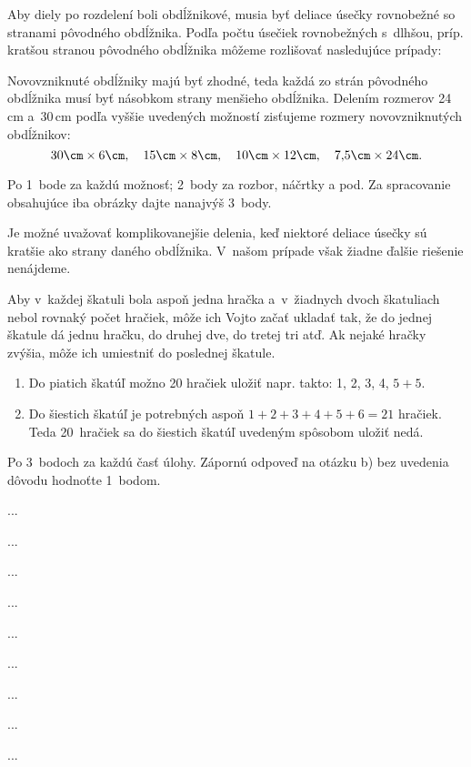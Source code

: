 {%
Aby diely po rozdelení boli obdĺžnikové, musia byť deliace úsečky rovnobežné so stranami pôvodného obdĺžnika.
Podľa počtu úsečiek rovnobežných s~dlhšou, príp. kratšou stranou pôvodného obdĺžnika môžeme rozlišovať nasledujúce prípady:
%

Novovzniknuté obdĺžniky majú byť zhodné, teda každá zo strán pôvodného obdĺžnika musí byť násobkom strany menšieho obdĺžnika.
Delením rozmerov 24\,cm a~30\,cm podľa vyššie uvedených možností zisťujeme rozmery novovzniknutých obdĺžnikov:
$$
30\cm\times6\cm, \quad 15\cm\times8\cm, \quad 10\cm\times12\cm, \quad 7{,}5\cm\times24\cm.
$$

\hodnotenie
Po 1~bode za každú možnosť;
2~body za rozbor, náčrtky a pod.
Za spracovanie obsahujúce iba obrázky dajte nanajvýš 3~body.

\poznamka
Je možné uvažovať komplikovanejšie delenia, keď niektoré deliace úsečky sú kratšie ako strany daného obdĺžnika.
V~našom prípade však žiadne ďalšie riešenie nenájdeme.
\endhodnotenie
}

{%
Aby v~každej škatuli bola aspoň jedna hračka a~v~žiadnych dvoch škatuliach nebol rovnaký počet hračiek, môže ich Vojto začať ukladať tak, že do jednej škatule dá jednu hračku, do druhej dve, do tretej tri atď.
Ak nejaké hračky zvýšia, môže ich umiestniť do poslednej škatule.

\begin{enumerate}\alphatrue
\item Do piatich škatúľ možno 20 hračiek uložiť napr. takto: 1, 2, 3, 4, $5+5$.
\item Do šiestich škatúľ je potrebných aspoň $1+2+3+4+5+6=21$ hračiek.
Teda 20~hračiek sa do šiestich škatúľ uvedeným spôsobom uložiť nedá.
\end{enumerate}

\hodnotenie
Po 3~bodoch za každú časť úlohy.
Zápornú odpoveď na otázku b) bez uvedenia dôvodu hodnoťte 1~bodom.
\endhodnotenie
}

{%
...}

{%
...}

{%
...}

{%
...}

{%
...}

{%
...}

{%
...}

{%
...}

{%
...}

